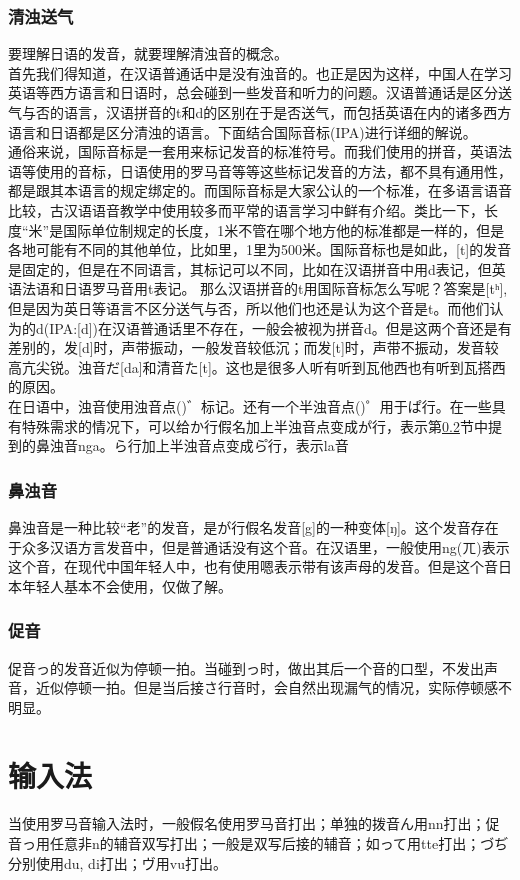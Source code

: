 \documentclass[12pt, a4paper, oneside]{book}
\newcommand{\jp}{\CJKfamily{zj}}
\begin{document}
\subsection{清浊送气}
要理解日语的发音，就要理解清浊音的概念。\\首先我们得知道，在汉语普通话中是没有浊音的。也正是因为这样，中国人在学习英语等西方语言和日语时，总会碰到一些发音和听力的问题。汉语普通话是区分送气与否的语言，汉语拼音的t和d的区别在于是否送气，而包括英语在内的诸多西方语言和日语都是区分清浊的语言。下面结合国际音标(IPA)进行详细的解说。
\\通俗来说，国际音标是一套用来标记发音的标准符号。而我们使用的拼音，英语法语等使用的音标，日语使用的罗马音等等这些标记发音的方法，都不具有通用性，都是跟其本语言的规定绑定的。而国际音标是大家公认的一个标准，在多语言语音比较，古汉语语音教学中使用较多而平常的语言学习中鲜有介绍。类比一下，长度“米”是国际单位制规定的长度，1米不管在哪个地方他的标准都是一样的，但是各地可能有不同的其他单位，比如里，1里为500米。国际音标也是如此，[t]的发音是固定的，但是在不同语言，其标记可以不同，比如在汉语拼音中用d表记，但英语法语和日语罗马音用t表记。
那么汉语拼音的t用国际音标怎么写呢？答案是[tʰ],但是因为英日等语言不区分送气与否，所以他们也还是认为这个音是t。而他们认为的d(IPA:[d])在汉语普通话里不存在，一般会被视为拼音d。但是这两个音还是有差别的，发[d]时，声带振动，一般发音较低沉；而发[t]时，声带不振动，发音较高亢尖锐。浊音だ[da]和清音た[t]。这也是很多人听{\jp {}}有听到瓦他西也有听到瓦搭西的原因。\\
在日语中，浊音使用浊音点({\jp {}})゛标记。还有一个半浊音点({\jp {}})゜用于ぱ行。在一些具有特殊需求的情况下，可以给か行假名加上半浊音点变成か゚行，表示第\ref{sct:bdo}节中提到的鼻浊音nga。ら行加上半浊音点变成ら゚行，表示la音
\subsection{鼻浊音}\label{sct:bdo}
鼻浊音是一种比较“老”的发音，是が行假名发音[g]的一种变体[ŋ]。这个发音存在于众多汉语方言发音中，但是普通话没有这个音。在汉语里，一般使用ng(ㄫ)表示这个音，在现代中国年轻人中，也有使用嗯表示带有该声母的发音。但是这个音日本年轻人基本不会使用，仅做了解。
\subsection{促音}
促音っ的发音近似为停顿一拍。当碰到っ时，做出其后一个音的口型，不发出声音，近似停顿一拍。但是当后接さ行音时，会自然出现漏气的情况，实际停顿感不明显。
\chapter{输入法}
当使用罗马音输入法时，一般假名使用罗马音打出；单独的拨音ん用nn打出；促音っ用任意非n的辅音双写打出；一般是双写后接的辅音；如って用tte打出；づぢ分别使用du, di打出；ヴ用vu打出。
\end{document}
